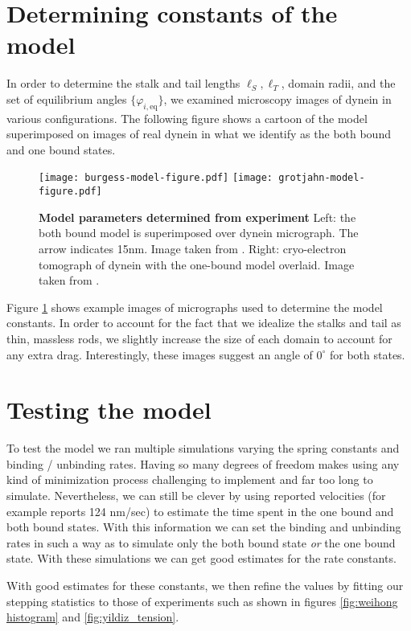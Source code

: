 \section{Determining constants of the model}
In order to determine the stalk and tail lengths $\ell_S, \ell_T$, domain radii, and the set of equilibrium angles $\{\varphi_{i,\text{eq}}\}$, we examined microscopy images of dynein in various configurations. The following figure shows a cartoon of the model superimposed on images of real dynein in what we identify as the both bound and one bound states. 
\begin{figure}[hbt!]
	\centering
	\texttt{[image: burgess-model-figure.pdf]}
	\texttt{[image: grotjahn-model-figure.pdf]}%
	\caption[Model parameters determined from experiment ]{\textbf{Model parameters determined from experiment} Left: the both bound model is superimposed over dynein micrograph. The arrow indicates 15nm. Image taken from \cite{burgess2003dynein}.  Right: cryo-electron tomograph of dynein with the one-bound model overlaid. Image taken from \cite{grotjahn}.} 
	\label{fig:superimpmosed}
\end{figure}
Figure \ref{fig:superimpmosed} shows example images of micrographs used to determine the model constants. In order to account for the fact that we idealize the stalks and tail as thin, massless rods, we slightly increase the size of each domain to account for any extra drag. Interestingly, these images suggest an angle of $0^\circ$ for both states.



\section{Testing the model} 
To test the model we ran multiple simulations varying the spring constants and binding / unbinding rates. Having so many degrees of freedom makes using any kind of minimization process challenging to implement and far too long to simulate. Nevertheless, we can still be clever by using reported velocities (for example \cite{dewitt2012cytoplasmic} reports 124 nm/sec) to estimate the time spent in the one bound and both bound states. With this information we can set the binding and unbinding rates in such a way as to simulate only the both bound state \textit{or} the one bound state. With these simulations we can get good estimates for the rate constants. 

With good estimates for these constants, we then refine the values by fitting our stepping statistics to those of experiments such as shown in figures \ref{fig:weihong histogram} and \ref{fig:yildiz_tension}. 
